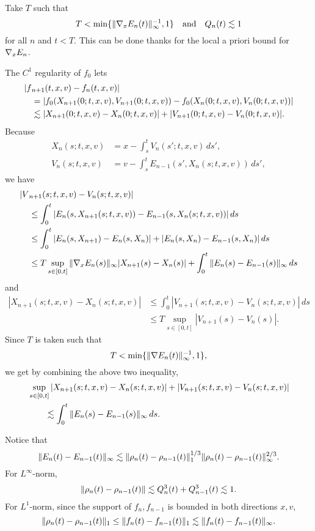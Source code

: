 \documentclass[11pt]{amsart}
\begin{document}
\begin{pfs}
\item
Take $T$ such that
\[T<\min\{\|\nabla_xE_n(t)\|_\infty^{-1},1\}\quad\text{and}\quad Q_n(t)\lesssim1\]
for all $n$ and $t<T$.
This can be done thanks for the local a priori bound for $\nabla_xE_n$.

The $C^1$ regularity of $f_0$ lets
\begin{align*}
|f&_{n+1}(t,x,v)-f_n(t,x,v)|\\
&=|f_0(X_{n+1}(0;t,x,v),V_{n+1}(0;t,x,v))-f_0(X_n(0;t,x,v),V_n(0;t,x,v))|\\
&\lesssim|X_{n+1}(0;t,x,v)-X_n(0;t,x,v)|+|V_{n+1}(0;t,x,v)-V_n(0;t,x,v)|.
\end{align*}
Because
\begin{align*}
X_n(s;t,x,v)&=x-\int_s^tV_n(s';t,x,v)\,ds',\\
V_n(s;t,x,v)&=v-\int_s^tE_{n-1}(s',X_n(s;t,x,v))\,ds',
\end{align*}
we have
\begin{align*}
|V&_{n+1}(s;t,x,v)-V_n(s;t,x,v)|\\
&\le\int_0^t|E_n(s,X_{n+1}(s;t,x,v))-E_{n-1}(s,X_n(s;t,x,v))|\,ds\\
&\le\int_0^t|E_n(s,X_{n+1})-E_n(s,X_n)|+|E_n(s,X_n)-E_{n-1}(s,X_n)|\,ds\\
&\le T\sup_{s\in[0,t]}\|\nabla_xE_n(s)\|_\infty|X_{n+1}(s)-X_n(s)|+\int_0^t\|E_n(s)-E_{n-1}(s)\|_\infty\,ds
\end{align*}
and
\begin{align*}
|X_{n+1}(s;t,x,v)-X_n(s;t,x,v)|
&\le\int_0^t|V_{n+1}(s;t,x,v)-V_n(s;t,x,v)|\,ds\\
&\le T\sup_{s\in[0,t]}|V_{n+1}(s)-V_n(s)|.
\end{align*}
Since $T$ is taken such that
\[T<\min\{\|\nabla E_n(t)\|_\infty^{-1},1\},\]
we get by combining the above two inequality,
\begin{align*}
&\sup_{s\in[0,t]}|X_{n+1}(s;t,x,v)-X_n(s;t,x,v)|+|V_{n+1}(s;t,x,v)-V_n(s;t,x,v)|\\
&\qquad\lesssim\int_0^t\|E_n(s)-E_{n-1}(s)\|_\infty\,ds.
\end{align*}
\item
Notice that
\[\|E_n(t)-E_{n-1}(t)\|_\infty\lesssim\|\rho_n(t)-\rho_{n-1}(t)\|_1^{1/3}\|\rho_n(t)-\rho_{n-1}(t)\|_\infty^{2/3}.\]
For $L^\infty$-norm,
\[\|\rho_n(t)-\rho_{n-1}(t)\|\lesssim Q_n^3(t)+Q_{n-1}^3(t)\lesssim1.\]
For $L^1$-norm, since the support of $f_n,f_{n-1}$ is bounded in both directions $x,v$,
\[\|\rho_n(t)-\rho_{n-1}(t)\|_1\le\|f_n(t)-f_{n-1}(t)\|_1\lesssim\|f_n(t)-f_{n-1}(t)\|_\infty.\]
\end{pfs}
\end{document}
